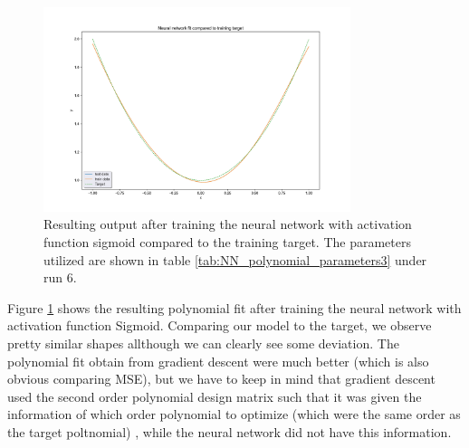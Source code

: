 \begin{figure}[H]
\centering
\includegraphics[width=0.8\textwidth]{Figures/PartB/NN_polyfit_result}
\caption{Resulting output after training the neural network with activation function sigmoid compared to the training target. 
The parameters utilized are shown in table \ref{tab:NN_polynomial_parameters3} under run 6.}
\label{fig:NN_polyfit_result}
\end{figure}

Figure \ref{fig:NN_polyfit_result} shows the resulting polynomial fit after training the neural network with activation function Sigmoid. 
Comparing our model to the target, we observe pretty similar shapes allthough we can clearly see some deviation. The polynomial fit obtain 
from gradient descent were much better (which is also obvious comparing MSE), but we have to keep in mind that gradient descent used the second 
order polynomial design matrix such that it was given the information of which order polynomial to optimize (which were the same order as the target poltnomial)
, while the neural network did not have this information. 

